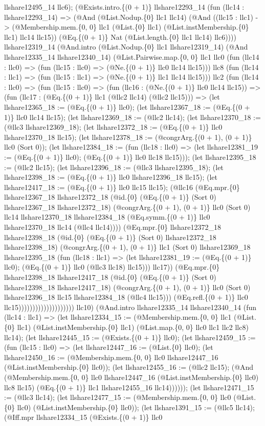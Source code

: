 \documentclass[11pt]{article}
\begin{document}
llshare12495\_14 llc6); (@Exists.intro.\{(0 + 1)\} llshare12293\_14 (fun (llc14 : llshare12293\_14) => (@And (@List.Nodup.\{0\} llc1 llc14) (@And ((llc15 : llc1) -> (@Membership.mem.\{0, 0\} llc1 (@List.\{0\} llc1) (@List.instMembership.\{0\} llc1) llc14 llc15)) (@Eq.\{(0 + 1)\} Nat (@List.length.\{0\} llc1 llc14) llc6)))) llshare12319\_14 (@And.intro (@List.Nodup.\{0\} llc1 llshare12319\_14) (@And llshare12335\_14 llshare12340\_14) (@List.Pairwise.map.\{0, 0\} llc1 llc0 (fun (llc14 : llc0) => (fun (llc15 : llc0) => (@Ne.\{(0 + 1)\} llc0 llc14 llc15))) llc8 (fun (llc14 : llc1) => (fun (llc15 : llc1) => (@Ne.\{(0 + 1)\} llc1 llc14 llc15))) llc2 (fun (llc14 : llc0) => (fun (llc15 : llc0) => (fun (llc16 : (@Ne.\{(0 + 1)\} llc0 llc14 llc15)) => (fun (llc17 : (@Eq.\{(0 + 1)\} llc1 (@llc2 llc14) (@llc2 llc15))) => (let llshare12365\_18 := (@Eq.\{(0 + 1)\} llc0); (let llshare12367\_18 := (@Eq.\{(0 + 1)\} llc0 llc14 llc15); (let llshare12369\_18 := (@llc2 llc14); (let llshare12370\_18 := (@llc3 llshare12369\_18); (let llshare12372\_18 := (@Eq.\{(0 + 1)\} llc0 llshare12370\_18 llc15); (let llshare12378\_18 := (@congrArg.\{(0 + 1), (0 + 1)\} llc0 (Sort 0)); (let llshare12384\_18 := (fun (llc18 : llc0) => (let llshare12381\_19 := (@Eq.\{(0 + 1)\} llc0); (@Eq.\{(0 + 1)\} llc0 llc18 llc15))); (let llshare12395\_18 := (@llc2 llc15); (let llshare12396\_18 := (@llc3 llshare12395\_18); (let llshare12398\_18 := (@Eq.\{(0 + 1)\} llc0 llshare12396\_18 llc15); (let llshare12417\_18 := (@Eq.\{(0 + 1)\} llc0 llc15 llc15); (@llc16 (@Eq.mpr.\{0\} llshare12367\_18 llshare12372\_18 (@id.\{0\} (@Eq.\{(0 + 1)\} (Sort 0) llshare12367\_18 llshare12372\_18) (@congrArg.\{(0 + 1), (0 + 1)\} llc0 (Sort 0) llc14 llshare12370\_18 llshare12384\_18 (@Eq.symm.\{(0 + 1)\} llc0 llshare12370\_18 llc14 (@llc4 llc14)))) (@Eq.mpr.\{0\} llshare12372\_18 llshare12398\_18 (@id.\{0\} (@Eq.\{(0 + 1)\} (Sort 0) llshare12372\_18 llshare12398\_18) (@congrArg.\{(0 + 1), (0 + 1)\} llc1 (Sort 0) llshare12369\_18 llshare12395\_18 (fun (llc18 : llc1) => (let llshare12381\_19 := (@Eq.\{(0 + 1)\} llc0); (@Eq.\{(0 + 1)\} llc0 (@llc3 llc18) llc15))) llc17)) (@Eq.mpr.\{0\} llshare12398\_18 llshare12417\_18 (@id.\{0\} (@Eq.\{(0 + 1)\} (Sort 0) llshare12398\_18 llshare12417\_18) (@congrArg.\{(0 + 1), (0 + 1)\} llc0 (Sort 0) llshare12396\_18 llc15 llshare12384\_18 (@llc4 llc15))) (@Eq.refl.\{(0 + 1)\} llc0 llc15)))))))))))))))))))) llc10) (@And.intro llshare12335\_14 llshare12340\_14 (fun (llc14 : llc1) => (let llshare12334\_15 := (@Membership.mem.\{0, 0\} llc1 (@List.\{0\} llc1) (@List.instMembership.\{0\} llc1) (@List.map.\{0, 0\} llc0 llc1 llc2 llc8) llc14); (let llshare12445\_15 := (@Exists.\{(0 + 1)\} llc0); (let llshare12459\_15 := (fun (llc15 : llc0) => (let llshare12447\_16 := (@List.\{0\} llc0); (let llshare12450\_16 := (@Membership.mem.\{0, 0\} llc0 llshare12447\_16 (@List.instMembership.\{0\} llc0)); (let llshare12455\_16 := (@llc2 llc15); (@And (@Membership.mem.\{0, 0\} llc0 llshare12447\_16 (@List.instMembership.\{0\} llc0) llc8 llc15) (@Eq.\{(0 + 1)\} llc1 llshare12455\_16 llc14)))))); (let llshare12471\_15 := (@llc3 llc14); (let llshare12477\_15 := (@Membership.mem.\{0, 0\} llc0 (@List.\{0\} llc0) (@List.instMembership.\{0\} llc0)); (let llshare1391\_15 := (@llc5 llc14); (@Iff.mpr llshare12334\_15 (@Exists.\{(0 + 1)\} llc0 
\end{document}
